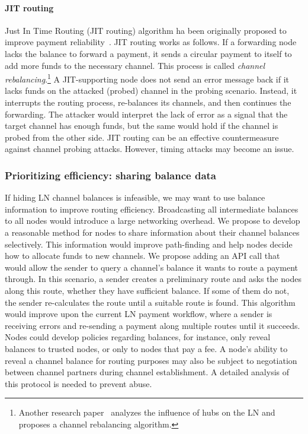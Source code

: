 \paragraph{JIT routing}
Just In Time Routing (JIT routing) algorithm ha been originally proposed to improve payment reliability~\cite{Pickhardt2019, Pickhardt2019a}.
JIT routing works as follows.
If a forwarding node lacks the balance to forward a payment, it sends a circular payment to itself to add more funds to the necessary channel.
This process is called \textit{channel rebalancing}.\footnote{Another research paper~\cite{Conoscenti2019} analyzes the influence of hubs on the LN and proposes a channel rebalancing algorithm.}
A JIT-supporting node does not send an error message back if it lacks funds on the attacked (probed) channel in the probing scenario.
Instead, it interrupts the routing process, re-balances its channels, and then continues the forwarding.
The attacker would interpret the lack of error as a signal that the target channel has enough funds, but the same would hold if the channel is probed from the other side.
JIT routing can be an effective countermeasure against channel probing attacks.
However, timing attacks may become an issue.


\subsubsection*{Prioritizing efficiency: sharing balance data}

If hiding LN channel balances is infeasible, we may want to use balance information to improve routing efficiency.
Broadcasting all intermediate balances to all nodes would introduce a large networking overhead.
We propose to develop a reasonable method for nodes to share information about their channel balances selectively.
This information would improve path-finding and help nodes decide how to allocate funds to new channels.
We propose adding an API call that would allow the sender to query a channel's balance it wants to route a payment through.
In this scenario, a sender creates a preliminary route and asks the nodes along this route, whether they have sufficient balance.
If some of them do not, the sender re-calculates the route until a suitable route is found.
This algorithm would improve upon the current LN payment workflow, where a sender is receiving errors and re-sending a payment along multiple routes until it succeeds.
Nodes could develop policies regarding balances, for instance, only reveal balances to trusted nodes, or only to nodes that pay a fee.
A node's ability to reveal a channel balance for routing purposes may also be subject to negotiation between channel partners during channel establishment.
A detailed analysis of this protocol is needed to prevent abuse.


